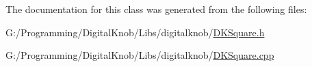 The documentation for this class was generated from the following files\-:\begin{DoxyCompactItemize}
\item 
G\-:/\-Programming/\-Digital\-Knob/\-Libs/digitalknob/\hyperlink{_d_k_square_8h}{D\-K\-Square.\-h}\item 
G\-:/\-Programming/\-Digital\-Knob/\-Libs/digitalknob/\hyperlink{_d_k_square_8cpp}{D\-K\-Square.\-cpp}\end{DoxyCompactItemize}
